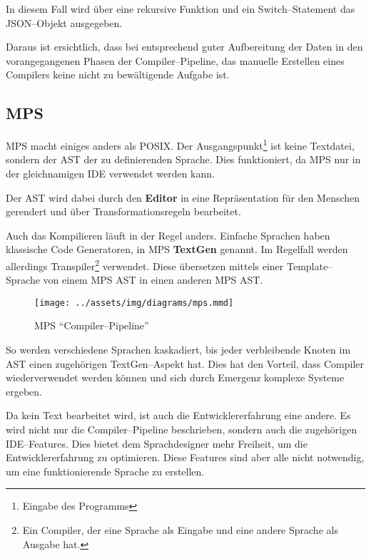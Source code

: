In diesem Fall wird über eine rekursive Funktion und ein Switch--Statement das \acs{JSON}--Objekt ausgegeben.

Daraus ist ersichtlich, dass bei entsprechend guter Aufbereitung der Daten in den vorangegangenen Phasen der Compiler--Pipeline, das manuelle Erstellen eines Compilers keine nicht zu bewältigende Aufgabe ist.

\subsection{\acl{MPS}}\label{subsec:meta-programming-system}
\ac{MPS} macht einiges anders als \ac{POSIX}.
Der Ausgangspunkt\footnote{Eingabe des Programms} ist keine Textdatei, sondern der \ac{AST} der zu definierenden Sprache.
Dies funktioniert, da \ac{MPS} nur in der gleichnamigen \ac{IDE} verwendet werden kann.

Der \ac{AST} wird dabei durch den \textbf{Editor} in eine Repräsentation für den Menschen gerendert und über Transformationsregeln bearbeitet.

Auch das Kompilieren läuft in der Regel anders.
Einfache Sprachen haben klassische Code Generatoren, in \ac{MPS} \textbf{TextGen} genannt.
Im Regelfall werden allerdings Transpiler\footnote{Ein Compiler, der eine Sprache als Eingabe und eine andere Sprache als Ausgabe hat.} verwendet.
Diese übersetzen mittels einer Template--Sprache von einem \ac{MPS} \ac{AST} in einen anderen \ac{MPS} \ac{AST}.

\begin{wrapfigure}{lH}{0.5\textwidth}
    \begin{center}
        \texttt{[image: ../assets/img/diagrams/mps.mmd]}
    \end{center}
    \caption{\acs{MPS} \enquote{Compiler--Pipeline}}
    \label{fig:mps-compiler-pipeline}
\end{wrapfigure}

So werden verschiedene Sprachen kaskadiert, bis jeder verbleibende Knoten im \ac{AST} einen zugehörigen TextGen--Aspekt hat.
Dies hat den Vorteil, dass Compiler wiederverwendet werden können und sich durch Emergenz komplexe Systeme ergeben.

Da kein Text bearbeitet wird, ist auch die Entwicklererfahrung eine andere.
Es wird nicht nur die Compiler--Pipeline beschrieben, sondern auch die zugehörigen \acs{IDE}--Features.
Dies bietet dem Sprachdesigner mehr Freiheit, um die Entwicklererfahrung zu optimieren.
Diese Features sind aber alle nicht notwendig, um eine funktionierende Sprache zu erstellen.

